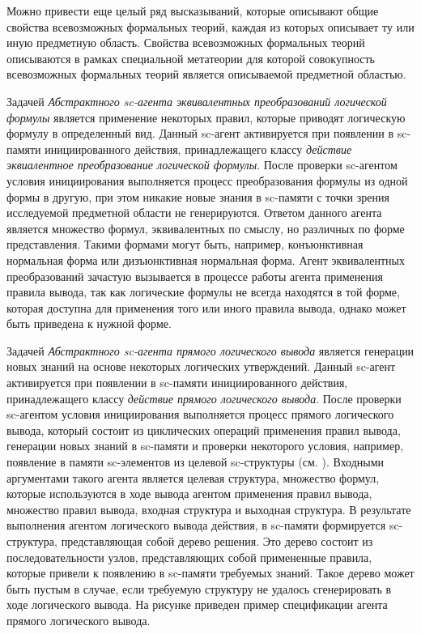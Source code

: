 Можно привести еще целый ряд высказываний, которые описывают общие свойства всевозможных формальных теорий, каждая из которых описывает ту или иную предметную область. Свойства всевозможных формальных теорий описываются в рамках специальной метатеории для которой совокупность всевозможных формальных теорий является описываемой предметной областью.

Задачей \textit{Абстрактного sc-агента эквивалентных преобразований логической формулы} является применение некоторых правил, которые приводят логическую формулу в определенный вид. Данный sc-агент активируется при появлении в sc-памяти инициированного действия, принадлежащего классу \textit{действие эквиалентное преобразование логической формулы}. После проверки sc-агентом условия инициирования выполняется процесс преобразования формулы из одной формы в другую, при этом никакие новые знания в sc-памяти с точки зрения исследуемой предметной области не генерируются. Ответом данного агента является множество формул, эквивалентных по смыслу, но различных по форме представления. Такими формами могут быть, например, конъюнктивная нормальная форма или дизъюнктивная нормальная форма. Агент эквивалентных преобразований зачастую вызывается в процессе работы агента применения правила вывода, так как логические формулы не всегда находятся в той форме, которая доступна для применения того или иного правила вывода, однако может быть приведена к нужной форме.

Задачей \textit{Абстрактного sc-агента прямого логического вывода} является генерации новых знаний на основе некоторых логических утверждений. Данный sc-агент активируется при появлении в sc-памяти инициированного действия, принадлежащего классу \textit{действие прямого логического вывода}. После проверки sc-агентом условия инициирования выполняется процесс прямого логического вывода, который состоит из циклических операций применения правил вывода, генерации новых знаний в sc-памяти и проверки некоторого условия, например, появление в памяти sc-элементов из целевой sc-структуры (см. ). Входными аргументами такого агента является целевая структура, множество формул, которые используются в ходе вывода агентом применения правил вывода, множество правил вывода, входная структура и выходная структура. В результате выполнения агентом логического вывода действия, в sc-памяти формируется sc-структура, представляющая собой дерево решения. Это дерево состоит из последовательности узлов, представляющих собой примененные правила, которые привели к появлению в sc-памяти требуемых знаний. Такое дерево может быть пустым в случае, если требуемую структуру не удалось сгенерировать в ходе логического вывода. На рисунке \textit{} приведен пример спецификации агента прямого логического вывода.

